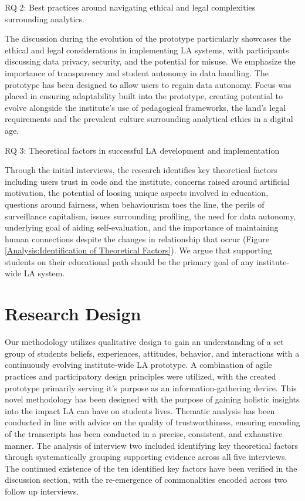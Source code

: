 \documentclass{l4proj}
\begin{document}
RQ 2: Best practices around navigating ethical and legal complexities surrounding analytics.

The discussion during the evolution of the prototype particularly showcases the ethical and legal considerations in implementing LA systems, with participants discussing data privacy, security, and the potential for misuse. We emphasize the importance of transparency and student autonomy in data handling. The prototype has been designed to allow users to regain data autonomy. Focus was placed in ensuring adaptability built into the prototype, creating potential to evolve alongside the institute's use of pedagogical frameworks, the land's legal requirements and the prevalent culture surrounding analytical ethics in a digital age.

RQ 3: Theoretical factors in successful LA development and implementation

Through the initial interviews, the research identifies key theoretical factors including users trust in code and the institute, concerns raised around artificial motivation, the potential of loosing unique aspects involved in education, questions around fairness, when behaviourism toes the line, the perils of surveillance capitalism, issues surrounding profiling, the need for data autonomy, underlying goal of aiding self-evaluation, and the importance of maintaining human connections despite the changes in relationship that occur (Figure \ref{Analysis:Identification of Theoretical Factors}). We argue that supporting students on their educational path should be the primary goal of any institute-wide LA system. 


\section{Research Design}

Our methodology utilizes qualitative design to gain an understanding of a set group of students beliefs, experiences, attitudes, behavior, and interactions with a continuously evolving institute-wide LA prototype. A combination of agile practices and participatory design principles were utilized, with the created prototype primarily serving it's purpose as an information-gathering device. This novel methodology has been designed with the purpose of gaining holistic insights into the impact LA can have on students lives. Thematic analysis has been conducted in line with \citet{nowell2017thematic} advice on the quality of trustworthiness, ensuring encoding of the transcripts has been conducted in a precise, consistent, and exhaustive manner. The analysis of interview two included identifying key theoretical factors through systematically grouping supporting evidence across all five interviews. The continued existence of the ten identified key factors have been verified in the discussion section, with the re-emergence of commonalities encoded across two follow up interviews. 
\end{document}
